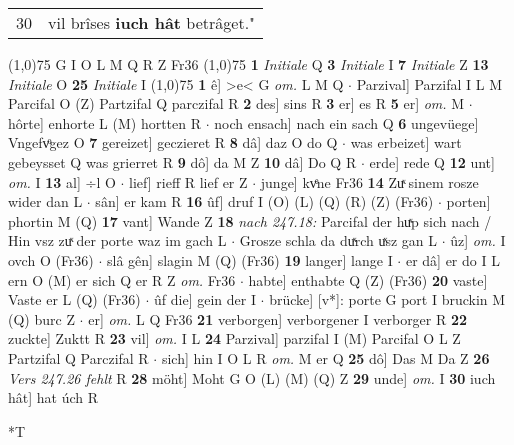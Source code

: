 \documentclass[8pt,a4paper,notitlepage]{article}
\begin{document}
\begin{table}[ht]
\begin{minipage}[t]{0.5\linewidth}
\begin{tabular}{rl}
30 & vil brîses \textbf{iuch hât} betrâget."\\ 
\end{tabular}
\scriptsize
\line(1,0){75} \newline
G I O L M Q R Z Fr36 \newline
\line(1,0){75} \newline
\textbf{1} \textit{Initiale} Q  \textbf{3} \textit{Initiale} I  \textbf{7} \textit{Initiale} Z  \textbf{13} \textit{Initiale} O  \textbf{25} \textit{Initiale} I  \newline
\line(1,0){75} \newline
\textbf{1} ê] >e< G \textit{om.} L M Q  $\cdot$ Parzival] Parzifal I L M Parcifal O (Z) Partzifal Q parczifal R \textbf{2} des] sins R \textbf{3} er] es R \textbf{5} er] \textit{om.} M  $\cdot$ hôrte] enhorte L (M) hortten R  $\cdot$ noch ensach] nach ein sach Q \textbf{6} ungevüege] Vngefvͦgez O \textbf{7} gereizet] geczieret R \textbf{8} dâ] daz O do Q  $\cdot$ was erbeizet] wart gebeysset Q was grierret R \textbf{9} dô] da M Z \textbf{10} dâ] Do Q R  $\cdot$ erde] rede Q \textbf{12} unt] \textit{om.} I \textbf{13} al] ÷l O  $\cdot$ lief] rieff R lief er Z  $\cdot$ junge] kvͤne Fr36 \textbf{14} Zuͯ sinem rosze wider dan L  $\cdot$ sân] er kam R \textbf{16} ûf] druf I (O) (L) (Q) (R) (Z) (Fr36)  $\cdot$ porten] phortin M (Q) \textbf{17} vant] Wande Z \textbf{18} \textit{nach 247.18:} Parcifal der huͯp sich nach / Hin vsz zuͯ der porte waz im gach L   $\cdot$ Grosze schla da duͯrch uͯsz gan L  $\cdot$ ûz] \textit{om.} I ovch O (Fr36)  $\cdot$ slâ gên] slagin M (Q) (Fr36) \textbf{19} langer] lange I  $\cdot$ er dâ] er do I L ern O (M) er sich Q er R Z \textit{om.} Fr36  $\cdot$ habte] enthabte Q (Z) (Fr36) \textbf{20} vaste] Vaste er L (Q) (Fr36)  $\cdot$ ûf die] gein der I  $\cdot$ brücke] [v*]: porte G port I bruckin M (Q) burc Z  $\cdot$ er] \textit{om.} L Q Fr36 \textbf{21} verborgen] verborgener I verborger R \textbf{22} zuckte] Zuktt R \textbf{23} vil] \textit{om.} I L \textbf{24} Parzival] parzifal I (M) Parcifal O L Z Partzifal Q Parczifal R  $\cdot$ sich] hin I O L R \textit{om.} M er Q \textbf{25} dô] Das M Da Z \textbf{26} \textit{Vers 247.26 fehlt} R  \textbf{28} möht] Moht G O (L) (M) (Q) Z \textbf{29} unde] \textit{om.} I \textbf{30} iuch hât] hat úch R \newline
\end{minipage}
\hspace{0.5cm}
\begin{minipage}[t]{0.5\linewidth}
\small
\begin{center}*T

\end{center}
\end{minipage}
\end{table}
\end{document}
